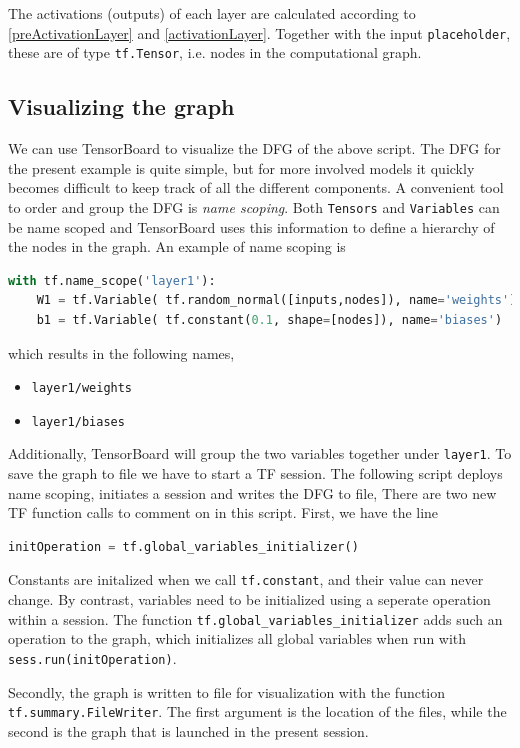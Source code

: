 \documentclass[twoside,english]{uiofysmaster}
\begin{document}
The activations (outputs) of each layer are calculated according to \eqref{preActivationLayer} and \eqref{activationLayer}. 
Together with the input \texttt{placeholder}, these are of type \texttt{tf.Tensor}, i.e. nodes in the computational 
graph. 

\subsection{Visualizing the graph}
We can use TensorBoard to visualize the DFG of the above script. The DFG for the present example is quite
simple, but for more involved models it quickly becomes difficult to keep track of all the different components. 
A convenient tool to order and group the DFG is \textit{name scoping}. Both \texttt{Tensors} and \texttt{Variables} can 
be name scoped and TensorBoard uses this information to define a hierarchy of the nodes in the graph. 
An example of name scoping is
\begin{lstlisting}[language=python]
 with tf.name_scope('layer1'):
    W1 = tf.Variable( tf.random_normal([inputs,nodes]), name='weights')
    b1 = tf.Variable( tf.constant(0.1, shape=[nodes]), name='biases')
\end{lstlisting}
which results in the following names,
\begin{itemize}
 \item \texttt{layer1/weights}
 \item \texttt{layer1/biases}
\end{itemize}
Additionally, TensorBoard will group the two variables together under \texttt{layer1}. 
To save the graph to file we have to start a TF session. The following script 
deploys name scoping, initiates a session and writes the DFG to file,
\label{lst:tensorBoardExample}
There are two new TF function calls to comment on in this script. First, we have the line
\begin{lstlisting}[language=Python]
 initOperation = tf.global_variables_initializer()
\end{lstlisting}
Constants are initalized when we call \texttt{tf.constant}, and their value can never change. 
By contrast, variables need to be initialized using a seperate operation within a session. 
The function \texttt{tf.global\_variables\_initializer} adds such an operation to the graph, which initializes
all global variables when run with \texttt{sess.run(initOperation)}. 

Secondly, the graph is written to file for visualization with the function \texttt{tf.summary.FileWriter}. 
The first argument is the location of the files, while the second is the graph that is launched in the
present session. 
\end{document}
